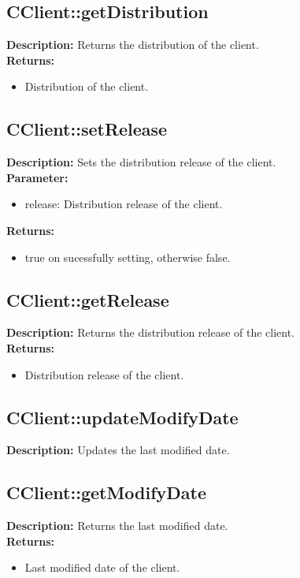 \subsection{CClient::getDistribution}
\textbf{Description:} Returns the distribution of the client.\\
\textbf{Returns:}
\begin{itemize}
\item Distribution of the client.
\end{itemize}

\subsection{CClient::setRelease}
\textbf{Description:} Sets the distribution release of the client.\\
\textbf{Parameter:}
\begin{itemize}
\item release: Distribution release of the client.
\end{itemize}
\textbf{Returns:}
\begin{itemize}
\item true on sucessfully setting, otherwise false.
\end{itemize}

\subsection{CClient::getRelease}
\textbf{Description:} Returns the distribution release of the client.\\
\textbf{Returns:}
\begin{itemize}
\item Distribution release of the client.
\end{itemize}

\subsection{CClient::updateModifyDate}
\textbf{Description:} Updates the last modified date.\\

\subsection{CClient::getModifyDate}
\textbf{Description:} Returns the last modified date.\\
\textbf{Returns:}
\begin{itemize}
\item Last modified date of the client.
\end{itemize}

